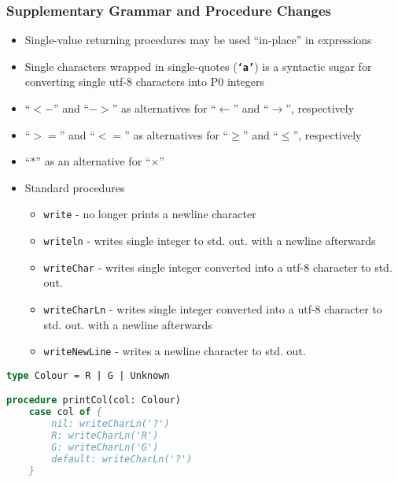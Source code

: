 \documentclass{beamer}
\begin{document}
\begin{frame}
\frametitle{Supplementary Grammar and Procedure Changes}

\begin{itemize}
 \item<1-> Single-value returning procedures may be used ``in-place'' in expressions
 \item<2-> Single characters wrapped in single-quotes (\textbf{\texttt{`a'}}) is a syntactic sugar for converting single utf-8 characters into P0 integers
 \item<3-> ``$<-$'' and ``$->$'' as alternatives for ``$\leftarrow$'' and ``$\rightarrow$'', respectively
 \item<4-> ``$>=$'' and ``$<=$'' as alternatives for ``$\geq$'' and ``$\leq$'', respectively
 \item<5-> ``$*$'' as an alternative for ``$\times$''
 \item<6-> Standard procedures
 \begin{itemize}
  \item \texttt{write} - no longer prints a newline character
  \item \texttt{writeln} - writes single integer to std. out. with a newline afterwards
  \item \texttt{writeChar} - writes single integer converted into a utf-8 character to std. out.
  \item \texttt{writeCharLn} - writes single integer converted into a utf-8 character to std. out. with a newline afterwards
  \item \texttt{writeNewLine} - writes a newline character to std. out.
 \end{itemize}
\end{itemize}

\end{frame}


\begin{lrbox}{\caseGenCode}
\begin{lstlisting}[language=Pascal,basicstyle=\tiny]
type Colour = R | G | Unknown

procedure printCol(col: Colour)
    case col of {
        nil: writeCharLn('?')
        R: writeCharLn('R')
        G: writeCharLn('G')
        default: writeCharLn('?')
    }

\end{lstlisting}
\end{lrbox}
\end{document}
